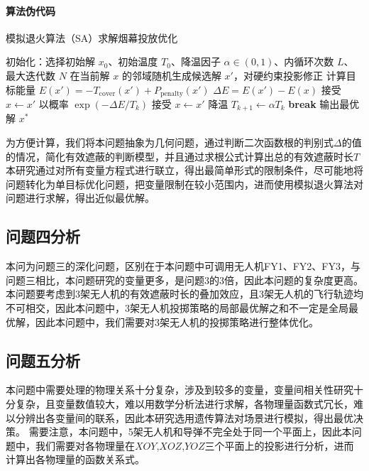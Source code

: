\documentclass{article}
\begin{document}
\paragraph{算法伪代码}
\begin{algorithm}[H]
\caption{模拟退火算法（SA）求解烟幕投放优化}
\begin{algorithmic}[1]
\State 初始化：选择初始解 $x_0$、初始温度 $T_0$、降温因子 $\alpha\in(0,1)$、内循环次数 $L$、最大迭代数 $N$
    \State 在当前解 $x$ 的邻域随机生成候选解 $x'$，对硬约束投影修正
    \State 计算目标能量 $E(x')=-T_{\mathrm{cover}}(x')+P_{\mathrm{penalty}}(x')$
    \State $\Delta E=E(x')-E(x)$
     接受 $x\leftarrow x'$
    \Else \State 以概率 $\exp(-\Delta E/T_k)$ 接受 $x\leftarrow x'$
    \EndIf
  \EndFor
  \State 降温 $T_{k+1}\leftarrow \alpha T_k$
   \textbf{break}
  \EndIf
\EndFor
\State 输出最优解 $x^*$
\end{algorithmic}
\end{algorithm}

为方便计算，我们将本问题抽象为几何问题，通过判断二次函数根的判别式$\Delta$的值的情况，简化有效遮蔽的判断模型，并且通过求根公式计算出总的有效遮蔽时长$T$
本研究通过对所有变量方程式进行联立，得出最简单形式的限制条件，尽可能地将问题转化为单目标优化问题，把变量限制在较小范围内，进而使用模拟退火算法对问题进行求解，得出近似最优解。

\subsection{问题四分析}
本问为问题三的深化问题，区别在于本问题中可调用无人机FY1、FY2、FY3，与问题三相比，本问题研究的变量更多，是问题3的3倍，因此本问题的复杂度更高。
本问题要考虑到3架无人机的有效遮蔽时长的叠加效应，且3架无人机的飞行轨迹均不可相交，因此本问题中，3架无人机投掷策略的局部最优解之和不一定是全局最优解，因此本问题中，我们需要对3架无人机的投掷策略进行整体优化。

\subsection{问题五分析}
本问题中需要处理的物理关系十分复杂，涉及到较多的变量，变量间相关性研究十分复杂，且变量数值较大，难以用数学分析法进行求解，各物理量函数式冗长，难以分辨出各变量间的联系，因此本研究选用遗传算法对场景进行模拟，得出最优决策。
需要注意，本问题中，5架无人机和导弹不完全处于同一个平面上，因此本问题中，我们需要对各物理量在$XOY$,$XOZ$,$YOZ$三个平面上的投影进行分析，进而计算出各物理量的函数关系式。
\end{document}
